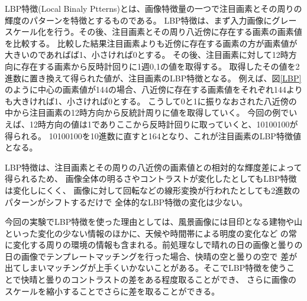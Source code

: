 LBP特徴(Local Binaly Ptterns)とは、画像特徴量の一つで注目画素とその周りの輝度のパターンを特徴とするものである。
LBP特徴は、まず入力画像にグレースケール化を行う。その後、注目画素とその周り八近傍に存在する画素の画素値を比較する。
比較した結果注目画素よりも近傍に存在する画素の方が画素値が大きいのであればば1、小さければ0とする。
その後、注目画素に対して12時方向に存在する画素から反時計回りに1週0,1の値を取得する。
取得したその値を2進数に置き換えて得られた値が、注目画素のLBP特徴となる。
例えば、図\ref{LBP}のように中心の画素値が144の場合、八近傍に存在する画素値をそれぞれ144よりも大きければ1、小さければ0とする。
こうして0と1に振りなおされた八近傍の中から注目画素の12時方向から反統計周りに値を取得していく。
今回の例でいえば、12時方向の値は1でありここから反時計回りに取っていくと、10100100が得られる。
10100100を10進数に直すと164となり、これが注目画素のLBP特徴値となる。

LBP特徴は、注目画素とその周りの八近傍の画素値との相対的な輝度差によって得られるため、
画像全体の明るさやコントラストが変化したとしてもLBP特徴は変化しにくく、
画像に対して回転などの線形変換が行われたとしても2進数のパターンがシフトするだけで
全体的なLBP特徴の変化は少ない。

今回の実験でLBP特徴を使った理由としては、風景画像には目印となる建物や山といった変化の少ない情報のほかに、天候や時間帯による明度の変化など
の常に変化する周りの環境の情報も含まれる。前処理なしで晴れの日の画像と曇りの日の画像でテンプレートマッチングを行った場合、快晴の空と曇りの空で
差が出てしまいマッチングが上手くいかないことがある。そこでLBP特徴を使うことで快晴と曇りのコントラストの差をある程度取ることができ、
さらに画像のスケールを縮小することでさらに差を取ることができる。